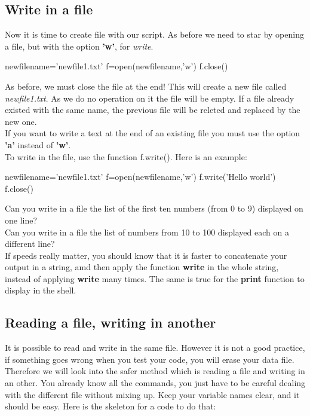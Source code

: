 \documentclass[article,10pt]{scrartcl}
\begin{document}
\subsection*{Write in a file}
Now it is time to create file with our script. As before we need to star by opening a file, but with the option \textbf{'w'}, for \textit{write}. 
\begin{python}
newfilename='newfile1.txt'
f=open(newfilename,'w')
f.close()
\end{python}
As before, we must close the file at the end! This will create a new file called \textit{newfile1.txt}. As we do no operation on it the file will be empty. If a file already existed with the same name, the previous file will be releted and replaced by the new one. \\
If you want to write a text at the end of an existing file you must use the option \textbf{'a'} instead of \textbf{'w'}. \\
To write in the file, use the function f.write(). Here is an example:
\begin{python}
newfilename='newfile1.txt'
f=open(newfilename,'w')
f.write('Hello world')
f.close()
\end{python}
Can you write in a file the list of the first ten numbers (from 0 to 9) displayed on one line?
\\
Can you write in a file the list of numbers from 10 to 100 displayed each on a different line?
\\

If speeds really matter, you should know that it is faster to concatenate your output in a string, amd then apply the function \textbf{write} in the whole string, instead of applying \textbf{write} many times. The same is true for the \textbf{print} function to display in the shell.

\subsection*{Reading a file, writing in another}
It is possible to read and write in the same file. However it is not a good practice, if something goes wrong when you test your code, you will erase your data file. Therefore we will look into the safer method which is reading a file and writing in an other. You already know all the commands, you just have to be careful dealing with the different file without mixing up. Keep your variable names clear, and it should be easy. Here is the skeleton for a code to do that:
\end{document}
